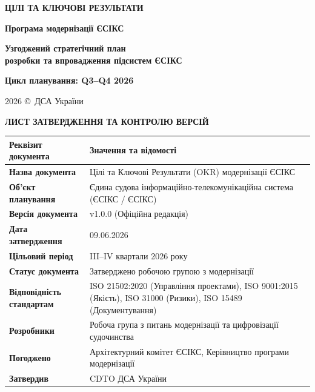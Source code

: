 \documentclass{article}
\newcommand\HUGE[1]{\fontsize{40}{40}\selectfont #1}
\begin{document}
\pagestyle{fancy}

\begin{titlepage}
  \AddToShipoutPictureBG*{\AtPageLowerLeft{\color{nato}\rule{\paperwidth}{\paperheight}}}
  \color{white}\thispagestyle{empty}\vspace*{3cm}\centering
  {\Huge \textbf{ЦІЛІ ТА КЛЮЧОВІ РЕЗУЛЬТАТИ} \par} \vspace{1cm}
  {\HUGE \textbf{Програма модернізації ЄСІКС} \par} \vspace{2cm}
  {\LARGE \textbf{Узгоджений стратегічний план \\ розробки та впровадження підсистем ЄСІКС} \par} \vspace{1.5cm}
  {\large\textbf{Цикл планування: Q3--Q4 2026} \par}
  \vfill
  {\large 2026 \copyright\ ДСА України \par}
\end{titlepage}

\newpage
\thispagestyle{empty}
\begin{center}
  {\Large\color{nato}\bfseries ЛИСТ ЗАТВЕРДЖЕННЯ ТА КОНТРОЛЮ ВЕРСІЙ\par}
\end{center}
\vspace{20pt}

\begin{longtable}{@{}p{4.0cm}p{10.2cm}@{}}
\toprule
\textbf{Реквізит документа} & \textbf{Значення та відомості} \\
\midrule
\textbf{Назва документа} & Цілі та Ключові Результати (OKR) модернізації ЄСІКС \\
\textbf{Об'єкт планування} & Єдина судова інформаційно-телекомунікаційна система (ЄСІКС / ЄСІКС) \\
\textbf{Версія документа} & v1.0.0 (Офіційна редакція) \\
\textbf{Дата затвердження} & 09.06.2026 \\
\textbf{Цільовий період} & III--IV квартали 2026 року \\
\textbf{Статус документа} & Затверджено робочою групою з модернізації \\
\textbf{Відповідність стандартам} & ISO 21502:2020 (Управління проектами), ISO 9001:2015 (Якість), ISO 31000 (Ризики), ISO 15489 (Документування) \\
\textbf{Розробники} & Робоча група з питань модернізації та цифровізації судочинства \\
\textbf{Погоджено} & Архітектурний комітет ЄСІКС, Керівництво програми модернізації \\
\textbf{Затвердив} & CDTO ДСА України \\
\bottomrule
\end{longtable}
\end{document}
